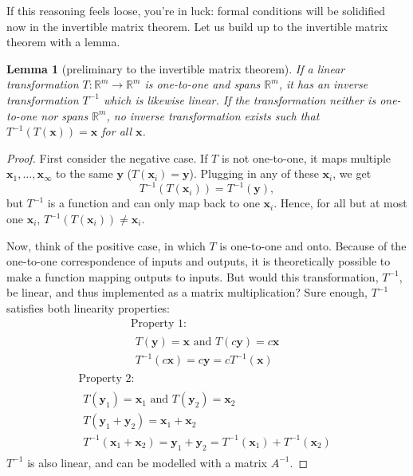 \documentclass[draft,12pt]{report}
\newtheorem{lemma}{Lemma}
\renewcommand{\vec}[1]{\mathbf{#1}}
\begin{document}
If this reasoning feels loose, you're in luck: formal conditions will be solidified now in the invertible matrix theorem. Let us build up to the invertible matrix theorem with a lemma.

\begin{lemma}[preliminary to the invertible matrix theorem]
    If a linear transformation $T : \mathbb R^m \rightarrow \mathbb R^m$ is one-to-one and spans $\mathbb R^m$, it has an inverse transformation $T^{-1}$ which is likewise linear. If the transformation neither is one-to-one nor spans $\mathbb R^m$, no inverse transformation exists such that $T^{-1}(T(\vec{x})) = \vec{x}$ for all $\vec{x}$.
\end{lemma}
\begin{proof}
    First consider the negative case. If $T$ is not one-to-one, it maps multiple $\vec{x}_1, \ldots, \vec{x}_\infty$ to the same $\vec{y}$ ($T(\vec{x}_i) = \vec{y}$). Plugging in any of these $\vec{x}_i$, we get
    \[ T^{-1}(T(\vec{x}_i)) = T^{-1}(\vec{y}), \]
    but $T^{-1}$ is a function and can only map back to one $\vec{x}_i$. Hence, for all but at most one $\vec{x}_i$, $T^{-1}(T(\vec{x}_i)) \neq \vec{x}_i$.
    
    Now, think of the positive case, in which $T$ is one-to-one and onto. Because of the one-to-one correspondence of inputs and outputs, it is theoretically possible to make a function mapping outputs to inputs. But would this transformation, $T^{-1}$, be linear, and thus implemented as a matrix multiplication? Sure enough, $T^{-1}$ satisfies both linearity properties:
    \begin{multline*}
        \text{Property 1:} \\
        \begin{aligned}
            T(\vec{y}) = \vec{x} \text{ and } T(c\vec{y}) = c\vec{x} \\
            T^{-1}(c\vec{x}) = c\vec{y} = cT^{-1}(\vec{x})
        \end{aligned}
    \end{multline*}
    \begin{multline*}
        \text{Property 2:} \\
        \begin{aligned}
            T(\vec{y}_1) = \vec{x}_1 \text{ and } T(\vec{y}_2) = \vec{x}_2 \\
            T(\vec{y}_1 + \vec{y}_2) = \vec{x}_1 + \vec{x}_2 \\
            T^{-1}(\vec{x}_1 + \vec{x}_2) = \vec{y}_1 + \vec{y}_2 = T^{-1}(\vec{x}_1) + T^{-1}(\vec{x}_2)
        \end{aligned}
    \end{multline*}
    $T^{-1}$ is also linear, and can be modelled with a matrix $A^{-1}$.
\end{proof}
\end{document}
